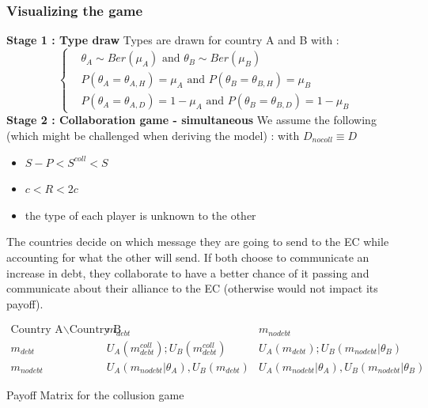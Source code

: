 \documentclass{article}
\begin{document}
\subsubsection{Visualizing the game}
\textbf{Stage 1 : Type draw }
Types are drawn for country A and B with : 
\begin{equation}
\left\{
\begin{aligned}
    &\theta_A\sim Ber(\mu_A) \text{ and } \theta_B\sim Ber(\mu_B)\\
    &P(\theta_A=\theta_{A,H}) = \mu_A \text{ and } P(\theta_B=\theta_{B,H}) = \mu_B\\
    &P(\theta_A=\theta_{A,D}) =  1-\mu_A \text{ and } P(\theta_B=\theta_{B,D}) = 1-\mu_B
\end{aligned}
\right.
\end{equation}
\textbf{Stage 2 : Collaboration game - simultaneous}
We assume the following (which might be challenged when deriving the model) : with $D_{nocoll}\equiv D$
\begin{itemize}
    \item $S-P<S^{coll}<S$
    \item $c<R<2c$
    \item the type of each player is unknown to the other
\end{itemize}
The countries decide on which message they are going to send to the EC while accounting for what the other will send. If both choose to communicate an increase in debt, they collaborate to have a better chance of it passing and communicate about their alliance to the EC (otherwise would not impact its payoff). 
\begin{table}[H]
$\begin{array}{c|cc}  
\text{Country A} \backslash \text{Country B} & m_{debt} & m_{nodebt} \\   
\hline   
m_{debt} & U_A(m_{debt}^{coll});U_B(m_{debt}^{coll}) & U_A(m_{debt});U_B(m_{nodebt}|\theta_B)\\  
m_{nodebt} & U_A(m_{nodebt}|\theta_A),U_B(m_{debt})& U_A(m_{nodebt}|\theta_A), U_B(m_{nodebt}|\theta_B) 
\end{array}$  
\caption{Payoff Matrix for the collusion game}  
\label{tab:payoff_matrix}  
\end{table}  
\end{document}

